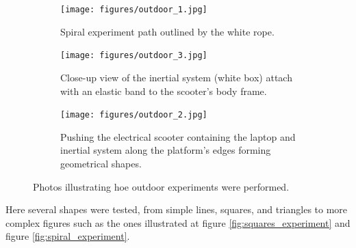 \begin{figure}[!h]
  \centering
  \begin{subfigure}{0.8\textwidth}
    \centering
    \texttt{[image: figures/outdoor\_1.jpg]}
    \caption{ Spiral experiment path outlined by the white rope. }
    \label{fig:outdoor_1}
  \end{subfigure}

  \begin{subfigure}{0.40\textwidth}
    \centering
    \texttt{[image: figures/outdoor\_3.jpg]}
    \caption{ Close-up view of the inertial system (white box) attach with an elastic band to the scooter's body frame. }
    \label{fig:outdoor_2}
  \end{subfigure}
  \begin{subfigure}{0.40\textwidth}
    \centering
    \texttt{[image: figures/outdoor\_2.jpg]}
    \caption{ Pushing the electrical scooter containing the laptop and inertial system along the platform's edges forming geometrical shapes. }
    \label{fig:outdoor_3}
  \end{subfigure}
  \caption{ Photos illustrating hoe outdoor experiments were performed.}
  \label{fig:outdoor_experiments}
\end{figure}

Here several shapes were tested, from simple lines, squares, and triangles to more complex figures such as the ones illustrated at figure \ref{fig:squares_experiment} and figure \ref{fig:spiral_experiment}.

